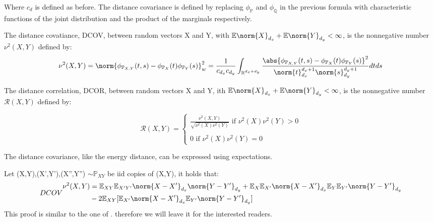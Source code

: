 Where $c_{d}$ is defined as before.
The distance covariance is defined by replacing $\phi_{\mathbb{P}}$ and $\phi_{\mathbb{Q}}$ in the previous formula with characteristic functions of the joint distribution and the product of the marginals respectively.
\begin{defn}
The distance covatiance, DCOV, between random vectors X and Y, with $\mathbb{E}\norm{X}_{d_{x}} + \mathbb{E}\norm{Y}_{d_{y}} < \infty$, is the nonnegative number $\nu^{2}(X,Y)$ defined by:
\vspace{5mm}
$$
\nu^{2}(X,Y) = \norm{\phi_{\mathbb{P}_{X,Y}}(t,s)-\phi_{\mathbb{P}_{X}}(t)\phi_{\mathbb{P}_{Y}}(s)}^{2}_{w} = \frac{1}{c_{d_{x}}c_{d_{y}}}\int_{\mathbb{R}^{d_{x} + d_{y}}}\frac{\abs{\phi_{\mathbb{P}_{X,Y}}(t,s)-\phi_{\mathbb{P}_{X}}(t)\phi_{\mathbb{P}_{Y}}(s)}^{2}}{\norm{t}^{d_{x}+1}_{d_{x}}\norm{s}^{d_{y}+1}_{d_{y}}} dtds
$$
\end{defn}
\begin{defn}
The distance correlation, DCOR, between random vectors X and Y, ith $\mathbb{E}\norm{X}_{d_{x}} + \mathbb{E}\norm{Y}_{d_{y}} < \infty$, is the nonnegative number $\mathcal{R}(X,Y)$ defined by:

$$
\mathcal{R}(X,Y) = \left \{
	\begin{array}{c} 
		\frac{\nu^{2}(X,Y)}{\sqrt{\nu^{2}(X)\nu^{2}(Y)}} \text{ if } \nu^{2}(X)\nu^{2}(Y) > 0 \\ 
		\\
		0 \text{ if } \nu^{2}(X)\nu^{2}(Y) = 0 
	\end{array}
	\right.  
$$
\end{defn}
The distance covariance, like the energy distance, can be expressed using expectations.
\begin{lem}
Let (X,Y),(X',Y'),(X'',Y'') $\sim \mathbb{P}_{XY}$ be iid copies of (X,Y), it holds that:
\begin{equation}{DCOV}
\begin{split}
\nu^{2}(X,Y)  
&= \mathbb{E}_{XY}\mathbb{E}_{X'Y'}\norm{X-X'}_{d_{x}}\norm{Y-Y'}_{d_{y}} + \mathbb{E}_{X}\mathbb{E}_{X'}\norm{X-X'}_{d_{x}}\mathbb{E}_{Y}\mathbb{E}_{Y'}\norm{Y-Y'}_{d_{y}} \\
&-2\mathbb{E}_{XY}[\mathbb{E}_{X'}\norm{X-X'}_{d_{x}}\mathbb{E}_{Y'}\norm{Y-Y'}_{d_{y}}]
\end{split}
\end{equation} 
This proof is similar to the one of \cite{DcovDemRara}. therefore we will leave it for the interested readers.
\end{lem}

